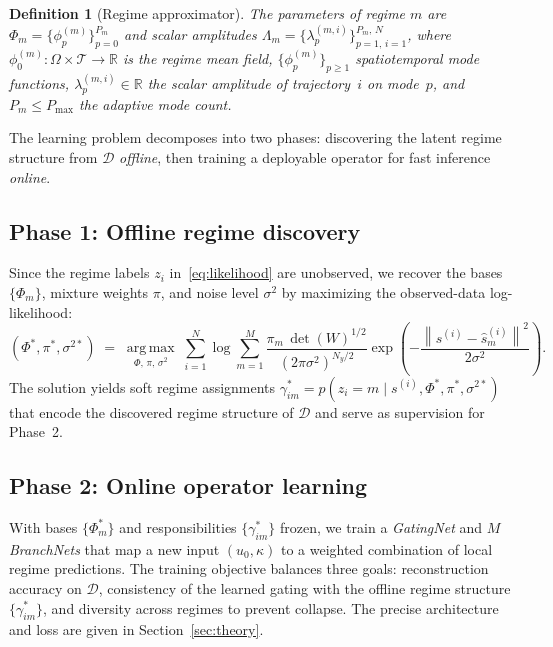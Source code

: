\documentclass{article}
\newtheorem{definition}{Definition}
\newcommand{\cD}{\mathcal{D}}
\newcommand{\normsq}[1]{\left\|#1\right\|^{2}}
\newcommand{\hats}{\hat{s}}
\begin{document}
\begin{definition}[Regime approximator]
\label{def:approx}
The parameters of regime $m$ are
$\Phi_m = \{\phi_p^{(m)}\}_{p=0}^{P_m}$
and scalar amplitudes
$\Lambda_m = \{\lambda_p^{(m,i)}\}_{p=1,\,i=1}^{P_m,\,N}$,
where $\phi_0^{(m)} : \Omega\times\mathcal{T}\to\mathbb{R}$ is the regime mean field,
$\{\phi_p^{(m)}\}_{p \geq 1}$ spatiotemporal mode functions,
$\lambda_p^{(m,i)}\in\mathbb{R}$ the scalar amplitude of trajectory~$i$ on mode~$p$,
and $P_m \leq P_{\max}$ the adaptive mode count.
\end{definition}

The learning problem decomposes into two phases: discovering the latent regime structure from $\cD$ \emph{offline}, then training a deployable operator for fast inference \emph{online}.


\subsection*{Phase 1: Offline regime discovery}

Since the regime labels $z_i$ in~\eqref{eq:likelihood} are unobserved,
we recover the bases $\{\Phi_m\}$, mixture weights $\pi$, and noise
level $\sigma^2$ by maximizing the observed-data log-likelihood:
\begin{equation}
  (\Phi^*,\pi^*,\sigma^{2*})
  \;=\; \operatorname*{arg\,max}_{\Phi,\,\pi,\,\sigma^2}
  \;\sum_{i=1}^N \log \sum_{m=1}^M
    \frac{\pi_m\,\det(W)^{1/2}}{(2\pi\sigma^2)^{N_y/2}}
    \exp\!\!\left(-\frac{\normsq{s^{(i)}-\hats_m^{(i)}}}{2\sigma^2}\right).
  \label{eq:mle}
\end{equation}
The solution yields soft regime assignments
$\gamma_{im}^* = p(z_i{=}m \mid s^{(i)},\Phi^*,\pi^*,\sigma^{2*})$
that encode the discovered regime structure of $\cD$
and serve as supervision for Phase~2.



\subsection*{Phase 2: Online operator learning}

With bases $\{\Phi_m^*\}$ and responsibilities $\{\gamma_{im}^*\}$
frozen, we train a \emph{GatingNet} and $M$ \emph{BranchNets} that
map a new input $(u_0, \kappa)$ to a weighted combination of local
regime predictions. The training objective balances three goals:
reconstruction accuracy on $\cD$, consistency of the learned gating
with the offline regime structure $\{\gamma_{im}^*\}$, and diversity
across regimes to prevent collapse. The precise architecture and loss
are given in Section~\ref{sec:theory}.
\end{document}
